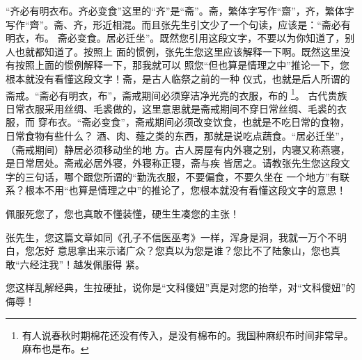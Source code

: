 “齐必有明衣布。齐必变食”这里的“齐”是“斋”。斋，繁体字写作“齋”，齐，繁体字
写作“齊”。斋、齐，形近相混。而且张先生引文少了一个句读，应该是：“斋必有明衣，布。
斋必变食。居必迁坐”。既然您引用这段文字，不要以为你知道了，别人也就都知道了。按照上
面的惯例，张先生您这里应该解释一下啊。既然这里没有按照上面的惯例解释一下，那我就可以
照您“但也算是情理之中”推论一下，您根本就没有看懂这段文字！斋，是古人临祭之前的一种
仪式，也就是后人所谓的斋戒。“斋必有明衣，布”，斋戒期间必须穿洁净光亮的衣服，布的
\footnote{有人说春秋时期棉花还没有传入，是没有棉布的。我国种麻织布时间非常早。麻布也是布。}。
古代贵族日常衣服采用丝绸、毛裘做的，这里意思就是斋戒期间不穿日常丝绸、毛裘的衣服，而
穿布衣。“斋必变食”，斋戒期间必须改变饮食，也就是不吃日常的食物，日常食物有些什么？
酒、肉、薤之类的东西，那就是说吃点蔬食。“居必迁坐”，（斋戒期间）静居必须移动坐的地
方。古人房屋有内外寝之别，内寝又称燕寝，是日常居处。斋戒必居外寝，外寝称正寝，斋与疾
皆居之。请教张先生您这段文字的三句话，哪个跟您所谓的“勤洗衣服，不要偏食，不要久坐在
一个地方”有联系？根本不用“也算是情理之中”的推论了，您根本就没有看懂这段文字的意思！

佩服死您了，您也真敢不懂装懂，硬生生凑您的主张！

张先生，您这篇文章如同《孔子不信医巫考》一样，浑身是洞，我就一万个不明白，您怎好
意思拿出来示诸广众？您真以为您是谁？您比不了陆象山，您也真敢“六经注我”！越发佩服得
紧。

您这样乱解经典，生拉硬扯，说你是“文科傻妞”真是对您的抬举，对“文科傻妞”的侮辱！ 